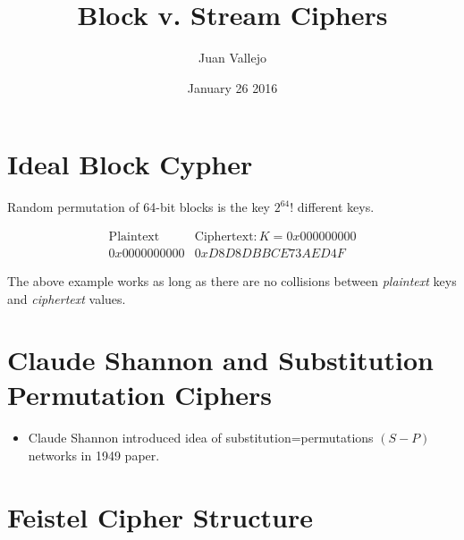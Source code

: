 \documentclass{article}
\title{Block v. Stream Ciphers}
\author{Juan Vallejo}
\date{January 26 2016}
\begin{document}
\maketitle

\section{Ideal Block Cypher}

Random permutation of 64-bit blocks is the key $2^64!$ different keys.

\begin{displaymath}
    \begin{array}{l|l}
        \mbox{Plaintext} & \mbox{Ciphertext}: K = 0x000000000 \\ \hline
        0x0000000000 & 0xD8D8DBBCE73AED4F
    \end{array}
\end{displaymath}

The above example works as long as there are no collisions between \textit{plaintext} keys and 
\textit{ciphertext} values.

\section{Claude Shannon and Substitution Permutation Ciphers}

\begin{itemize}
    \item Claude Shannon introduced idea of substitution=permutations $(S-P)$ networks in 1949 paper.
\end{itemize}

\section{Feistel Cipher Structure}
\end{document}
